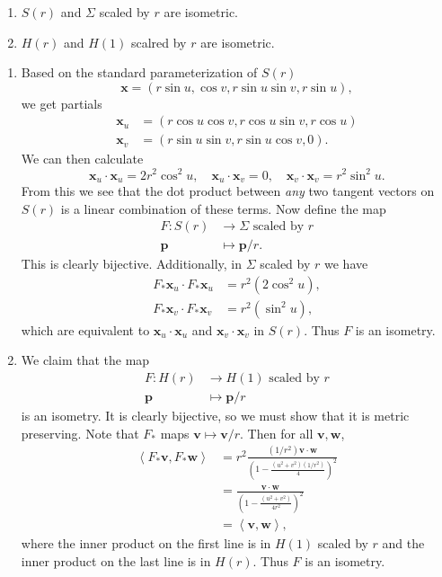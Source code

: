 \documentclass[10pt]{report}
\begin{document}
\pagebreak
\begin{exer}[7.2: 8]
	\begin{enumerate}
		\item $S(r)$ and $\Sigma$ scaled by $r$ are isometric.
		\item $H(r)$ and $H(1)$ scalred by $r$ are isometric.
	\end{enumerate}
\end{exer}
\begin{enumerate}
	\item
		Based on the standard parameterization of $S(r)$
		\[
			\mathbf{x} = (r \sin u, \cos v,r\sin u \sin v,r \sin u),
		\] we get partials
		\begin{align*}
			\mathbf{x}_{u} &= (r\cos u\cos v,r\cos u\sin v,r\cos u) \\
			\mathbf{x}_{v} &= (r\sin u\sin v, r\sin u \cos v,0).
		\end{align*}
		We can then calculate
		\[
		\mathbf{x}_{u}\cdot \mathbf{x}_{u} = 2r^2\cos^2 u, \quad \mathbf{x}_{u}\cdot \mathbf{x}_{v} = 0, \quad \mathbf{x}_{v}\cdot \mathbf{x}_{v} = r^2\sin^2 u.
		\] 
		From this we see that the dot product between \textit{any} two tangent vectors on $S(r)$ is a linear combination of these terms. Now define the map
		\begin{align*}
			F:S(r) &\to \Sigma \text{ scaled by } r \\
			\mathbf{p}&\mapsto \mathbf{p}/r.
		\end{align*}
		This is clearly bijective. Additionally, in $\Sigma$ scaled by $r$ we have
		\begin{align*}
			F_{*}\mathbf{x}_{u}\cdot F_{*}\mathbf{x}_{u} &= r^2 (2 \cos^2 u), \\
			F_{*}\mathbf{x}_{v}\cdot F_{*}\mathbf{x}_{v} &= r^2 (\sin^2 u),
		\end{align*}
		which are equivalent to $\mathbf{x}_{u} \cdot \mathbf{x}_{u}$ and $\mathbf{x}_{v} \cdot \mathbf{x}_{v}$ in $S(r)$. Thus $F$ is an isometry.

	\item We claim that the map
		\begin{align*}
			F:H(r)&\to H(1) \text{ scaled by } r\\
			\mathbf{p}&\mapsto \mathbf{p}/r
		\end{align*}
		is an isometry. It is clearly bijective, so we must show that it is metric preserving. Note that $F_{*}$ maps $\mathbf{v} \mapsto \mathbf{v}/r$. Then for all $\mathbf{v},\mathbf{w}$,
		\begin{align*}
			\left\langle F_{*}\mathbf{v},F_{*}\mathbf{w} \right\rangle &= r^2\frac{(1/r^2)\mathbf{v}\cdot \mathbf{w}}{\left(1 - \frac{(u^2+v^2)(1/r^2)}{4}\right)^2} \\
			&= \frac{\mathbf{v}\cdot \mathbf{w}}{\left(1 - \frac{(u^2+v^2)}{4r^2}\right)^2} \\
			&= \left\langle \mathbf{v},\mathbf{w} \right\rangle,
		\end{align*}
		where the inner product on the first line is in $H(1)$ scaled by $r$ and the inner product on the last line is in $H(r)$. Thus $F$ is an isometry.
\end{enumerate}
\end{document}
